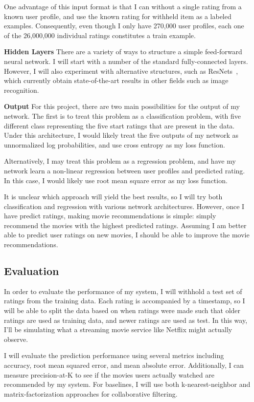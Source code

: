\documentclass[12pt]{article}
\begin{document}
One advantage of this input format is that I can without a single rating from
a known user profile, and use the known rating for withheld item as a labeled
examples. Consequently, even though I only have 270,000 user profiles, each
one of the 26,000,000 individual ratings constitutes a train example.

\textbf{Hidden Layers} There are a variety of ways to structure a simple
feed-forward neural network.  I will start with a number of the standard
fully-connected layers.  However, I will also experiment with alternative
structures, such as ResNets~\cite{resnets}, which currently obtain
state-of-the-art results in other fields such as image recognition.

\textbf{Output} For this project, there are two main possibilities for the
output of my network.
The first is to treat this problem as a classification problem, with five
different class representing the five start ratings that are present in the
data.
Under this architecture, I would likely treat the five outputs of my network
as unnormalized log probabilities, and use cross entropy as my loss function.

Alternatively, I may treat this problem as a regression problem, and have my
network learn a non-linear regression between user profiles and predicted
rating.
In this case, I would likely use root mean square error as my loss function.

It is unclear which approach will yield the best results, so I will try both
classification and regression with various network architectures.
However, once I have predict ratings, making movie recommendations is simple:
simply recommend the movies with the highest predicted ratings.
Assuming I am better able to predict user ratings on new movies, I should be
able to improve the movie recommendations.

\subsection{Evaluation}

In order to evaluate the performance of my system, I will withhold a test set
of ratings from the training data.
Each rating is accompanied by a timestamp, so I will be able to split the data
based on when ratings were made such that older ratings are used as training
data, and newer ratings are used as test.
In this way, I'll be simulating what a streaming movie service like Netflix
might actually observe.

I will evaluate the prediction performance using several metrics including
accuracy, root mean squared error, and mean absolute error.
Additionally, I can measure precision-at-K to see if the movies users actually
watched are recommended by my system.
For baselines, I will use both k-nearest-neighbor and matrix-factorization
approaches for collaborative filtering.
\end{document}
